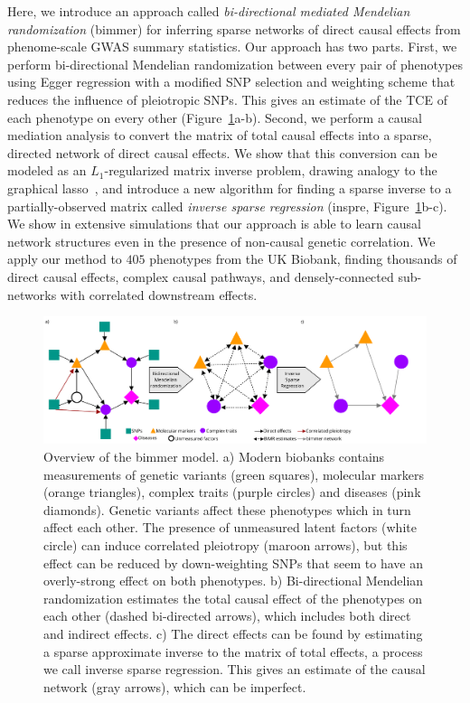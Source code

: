 \documentclass{article}
\begin{document}
Here, we introduce an approach called
\emph{bi-directional mediated Mendelian randomization} (bimmer)
for inferring sparse networks of direct causal effects from phenome-scale
GWAS summary statistics.
Our approach has two parts. First, we perform bi-directional Mendelian randomization
between every pair of phenotypes using Egger regression with a
modified SNP selection and weighting scheme that reduces the
influence of pleiotropic SNPs.
This gives an estimate of the TCE of each phenotype on every other (Figure~\ref{figure0}a-b).
Second,
we perform a causal mediation analysis to convert the matrix
of total causal effects into a sparse, directed network of direct causal effects.
We show that this conversion can be modeled as an $L_1$-regularized matrix inverse problem,
drawing analogy to the graphical lasso~\cite{Friedman2007}, and introduce a new
algorithm for finding a sparse inverse to a partially-observed matrix called
\emph{inverse sparse regression} (inspre, Figure~\ref{figure0}b-c).
We show in extensive simulations that our approach is able to learn causal
 network structures even in the presence of non-causal genetic correlation.
We apply our method to $405$ phenotypes from the UK Biobank, finding thousands
 of direct causal effects, complex causal pathways, and densely-connected sub-networks
 with correlated downstream effects. 
 
\begin{figure}\label{figure0}
\includegraphics[width=\textwidth]{figures/bimmer_fig1.pdf}
\caption{Overview of the bimmer model. a) Modern biobanks contains measurements
of genetic variants (green squares), molecular markers
(orange triangles), complex traits (purple circles) and diseases (pink diamonds). Genetic variants
affect these phenotypes which in turn affect each other. The presence of unmeasured latent factors
(white circle)
can induce correlated pleiotropy (maroon arrows), but this effect can be reduced by down-weighting
SNPs that seem to have an overly-strong effect on both phenotypes. b) Bi-directional Mendelian randomization
estimates the total causal effect of the phenotypes on each other (dashed bi-directed arrows),
which includes both direct and indirect effects. c) The direct effects can be
found by estimating a sparse approximate inverse to the matrix of total effects, a process we
call inverse sparse regression. This gives an estimate of the causal network (gray arrows), which
can be imperfect.}
\end{figure}
\end{document}
